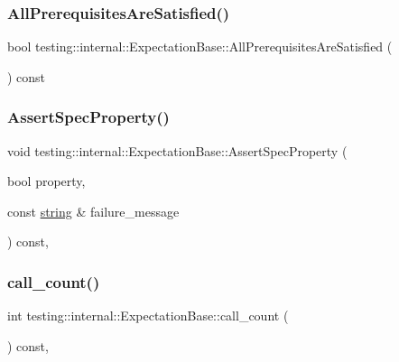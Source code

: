 \subsubsection{\texorpdfstring{All\+Prerequisites\+Are\+Satisfied()}{AllPrerequisitesAreSatisfied()}}
{\footnotesize\ttfamily bool testing\+::internal\+::\+Expectation\+Base\+::\+All\+Prerequisites\+Are\+Satisfied (\begin{DoxyParamCaption}{ }\end{DoxyParamCaption}) const\hspace{0.3cm}{\ttfamily [protected]}}

\mbox{\label{classtesting_1_1internal_1_1_expectation_base_a2644117ae8b59bd19aa526549a11d84e}} 
\subsubsection{\texorpdfstring{Assert\+Spec\+Property()}{AssertSpecProperty()}}
{\footnotesize\ttfamily void testing\+::internal\+::\+Expectation\+Base\+::\+Assert\+Spec\+Property (\begin{DoxyParamCaption}\item[{bool}]{property,  }\item[{const \hyperlink{namespacetesting_1_1internal_a8e8ff5b11e64078831112677156cb111}{string} \&}]{failure\+\_\+message }\end{DoxyParamCaption}) const\hspace{0.3cm}{\ttfamily [inline]}, {\ttfamily [protected]}}

\mbox{\label{classtesting_1_1internal_1_1_expectation_base_aacc0399271907194ac1627439f65047a}} 
\subsubsection{\texorpdfstring{call\+\_\+count()}{call\_count()}}
{\footnotesize\ttfamily int testing\+::internal\+::\+Expectation\+Base\+::call\+\_\+count (\begin{DoxyParamCaption}{ }\end{DoxyParamCaption}) const\hspace{0.3cm}{\ttfamily [inline]}, {\ttfamily [protected]}}

